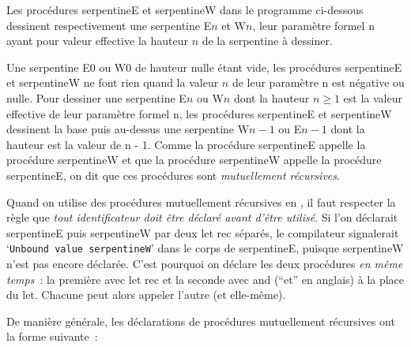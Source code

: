 \noindent Les procédures {\idt serpentineE} et {\idt serpentineW} dans le programme ci-dessous
dessinent respectivement une serpentine {\idt E$\scriptscriptstyle n$} et 
{\idt W$\scriptscriptstyle n$}, leur paramètre formel {\idt n} ayant pour valeur effective
la hauteur $n$ de la serpentine à dessiner. 

\noindent Une serpentine
{\idt E$\scriptscriptstyle 0$} ou {\idt W$\scriptscriptstyle 0$} de hauteur nulle étant vide, 
les procédures {\idt serpentineE} et {\idt serpentineW} ne font rien quand la valeur $n$ de leur 
paramètre {\idt n} est négative ou nulle. 
Pour dessiner une serpentine {\idt E$\scriptscriptstyle n$} ou {\idt W$\scriptscriptstyle n$} dont la 
hauteur $n \geq 1$ est la valeur effective de leur paramètre formel {\idt n}, les procédures 
{\idt serpentineE} et {\idt serpentineW} dessinent la 
base puis au-dessus une serpentine {\idt W$\scriptscriptstyle n-1$} 
ou {\idt E$\scriptscriptstyle n-1$} dont  la hauteur est la valeur de {\idt n - 1}. Comme
la procédure {\idt serpentineE} appelle la procédure {\idt serpentineW} et que la procédure
{\idt serpentineW} appelle la procédure {\idt serpentineE}, on dit que ces procédures sont
{\em mutuellement récursives\/}.

Quand on utilise des procédures mutuellement récursives en \ocaml, il faut
respecter la règle que {\em tout identificateur doit être déclaré avant d'être
utilisé}. Si l'on déclarait {\idt serpentineE} puis {\idt serpentineW} par deux
{\mcl let rec} séparés, le compilateur signalerait `{\tt Unbound value serpentineW}' dans le corps de
{\idt serpentineE}, puisque {\idt serpentineW} n'est pas encore déclarée. C'est pourquoi on
déclare les deux procédures {\em en même temps}~: la première avec {\mcl let rec} et la seconde
avec {\mcl and} (``et'' en anglais) à la place du {\mcl let}. Chacune peut alors appeler
l'autre (et elle-même).

De manière générale, les déclarations de procédures mutuellement
ré\-cur\-si\-ves ont  la forme suivante~:

\vfill

